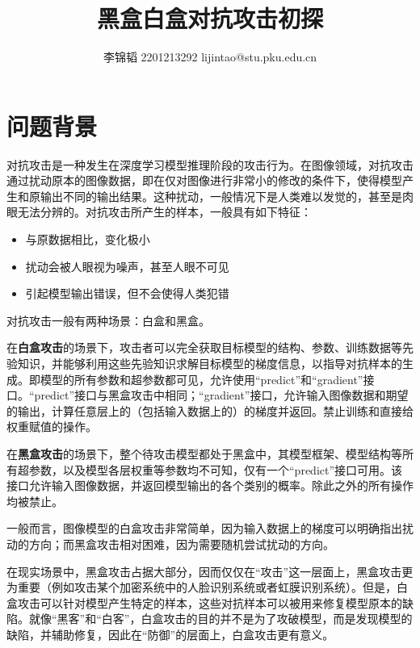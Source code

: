 \documentclass[journal, a4paper]{IEEEtran}
\begin{document}
	\title{\textbf{黑盒白盒对抗攻击初探}}
    \author{李锦韬 2201213292 lijintao@stu.pku.edu.cn}
	\maketitle

\section{\textbf{问题背景}}
\label{section:adversarial attack}

对抗攻击是一种发生在深度学习模型推理阶段的攻击行为。在图像领域，对抗攻击通过扰动原本的图像数据，即在仅对图像进行非常小的修改的条件下，使得模型产生和原输出不同的输出结果。这种扰动，一般情况下是人类难以发觉的，甚至是肉眼无法分辨的。对抗攻击所产生的样本，一般具有如下特征：

\begin{itemize}
    \item 与原数据相比，变化极小
    \item 扰动会被人眼视为噪声，甚至人眼不可见
    \item 引起模型输出错误，但不会使得人类犯错
\end{itemize}

对抗攻击一般有两种场景：白盒和黑盒。

在\textbf{白盒攻击}的场景下，攻击者可以完全获取目标模型的结构、参数、训练数据等先验知识，并能够利用这些先验知识求解目标模型的梯度信息，以指导对抗样本的生成。即模型的所有参数和超参数都可见，允许使用``predict''和``gradient''接口。``predict''接口与黑盒攻击中相同；``gradient''接口，允许输入图像数据和期望的输出，计算任意层上的（包括输入数据上的）的梯度并返回。禁止训练和直接给权重赋值的操作。

在\textbf{黑盒攻击}的场景下，整个待攻击模型都处于黑盒中，其模型框架、模型结构等所有超参数，以及模型各层权重等参数均不可知，仅有一个``predict''接口可用。该接口允许输入图像数据，并返回模型输出的各个类别的概率。除此之外的所有操作均被禁止。

一般而言，图像模型的白盒攻击非常简单，因为输入数据上的梯度可以明确指出扰动的方向；而黑盒攻击相对困难，因为需要随机尝试扰动的方向。

在现实场景中，黑盒攻击占据大部分，因而仅仅在``攻击''这一层面上，黑盒攻击更为重要（例如攻击某个加密系统中的人脸识别系统或者虹膜识别系统）。但是，白盒攻击可以针对模型产生特定的样本，这些对抗样本可以被用来修复模型原本的缺陷。就像``黑客''和``白客''，白盒攻击的目的并不是为了攻破模型，而是发现模型的缺陷，并辅助修复，因此在``防御''的层面上，白盒攻击更有意义。
\end{document}
